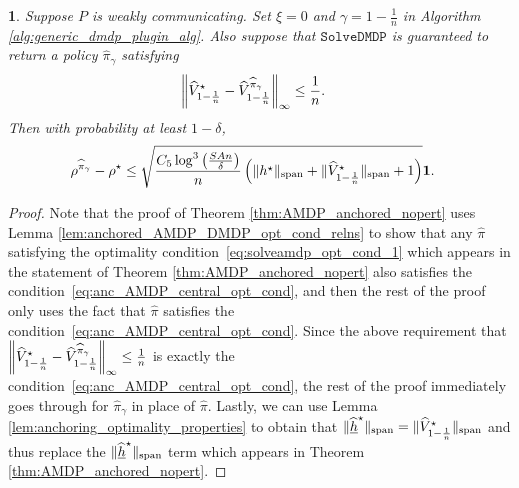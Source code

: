 \documentclass{article}
\theoremstyle{plain}
\newtheorem{thm}{\protect\theoremname}
\theoremstyle{plain}
\theoremstyle{remark}
\theoremstyle{plain}
\theoremstyle{plain}
\providecommand{\theoremname}{Theorem}
\newcommand{\Vhat}{\widehat{V}}
\newcommand{\one}{\mathbf{1}}
\newcommand{\pihat}{\widehat{\pi}}
\newcommand{\hhat}{\widehat{h}}
\newcommand{\SolveDMDP}{\texttt{SolveDMDP}}
\newcommand{\hhatanc}{\underline{\hhat}}
\begin{document}
\begin{thm}
    \label{thm:AMDP_anchored_nopert_DMDP_red}
    Suppose $P$ is weakly communicating. Set $\xi = 0$ and $\gamma = 1-\frac{1}{n}$ in Algorithm \ref{alg:generic_dmdp_plugin_alg}. Also suppose that $\SolveDMDP$ is guaranteed to return a policy $\pihat_\gamma$ satisfying
    \begin{align*}
       \infnorm{\Vhat^{\star}_{1-\frac{1}{n}} - \Vhat^{\pihat_\gamma}_{1-\frac{1}{n}}} & \leq \frac{1}{n}.
    \end{align*}
   Then with probability at least $1-\delta$,
    \begin{align*}
        \rho^{\pihat_\gamma} - \rho^\star & \leq  \sqrt{\frac{C_5 \log^3 \left( \frac{SAn}{\delta} \right)}{n} \left( \spannorm{h^\star} + \spannorm{\Vhat^\star_{1-\frac{1}{n}}} + 1 \right) }\one.
    \end{align*}
\end{thm}
\begin{proof}
    Note that the proof of Theorem \ref{thm:AMDP_anchored_nopert} uses Lemma \ref{lem:anchored_AMDP_DMDP_opt_cond_relns} to show that any $\pihat$ satisfying the optimality condition~\eqref{eq:solveamdp_opt_cond_1} which appears in the statement of Theorem \ref{thm:AMDP_anchored_nopert} also satisfies the condition~\eqref{eq:anc_AMDP_central_opt_cond}, and then the rest of the proof only uses the fact that $\pihat$ satisfies the condition~\eqref{eq:anc_AMDP_central_opt_cond}. Since the above requirement that $\infnorm{\Vhat^{\star}_{1-\frac{1}{n}} - \Vhat^{\pihat_\gamma}_{1-\frac{1}{n}}}  \leq \frac{1}{n}$ is exactly the condition~\eqref{eq:anc_AMDP_central_opt_cond}, the rest of the proof immediately goes through for $\pihat_\gamma$ in place of $\pihat$. Lastly, we can use Lemma \ref{lem:anchoring_optimality_properties} to obtain that $\spannorm{\hhatanc^{\star}} = \spannorm{\Vhat^\star_{1-\frac{1}{n}}}$ and thus replace the $\spannorm{\hhatanc^{\star}}$ term which appears in Theorem \ref{thm:AMDP_anchored_nopert}.
\end{proof}
\end{document}
